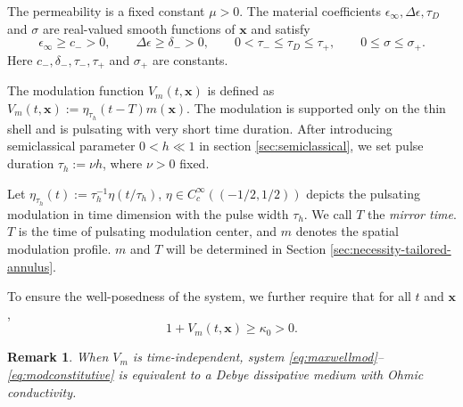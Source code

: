 \documentclass[11pt,reqno]{amsart}
\newtheorem{remark}{Remark}[section]
\numberwithin{equation}{section}
\begin{document}
The permeability is a fixed constant $\mu>0$. The material coefficients $\epsilon_\infty, \Delta\epsilon, \tau_D$ and $\sigma$ are real-valued smooth functions of $\bm{x}$ and satisfy
\begin{equation}\label{eq:modH}
\epsilon_\infty\geq c_->0,
\qquad
\Delta\epsilon\geq\delta_->0,
\qquad
0<\tau_-\le\tau_D\le\tau_+,
\qquad
0\le\sigma\le\sigma_+.
\end{equation}
Here $c_-, \delta_-, \tau_-, \tau_+$ and $\sigma_+$ are constants. 

The modulation function $V_m(t,\bm{x})$ is defined as $V_m(t,\bm{x}):=\eta_{\tau_h}(t-T)m(\bm{x})$. The modulation is supported only on the thin shell and is pulsating with very short time duration. After introducing semiclassical parameter $0<h\ll 1$ in section \ref{sec:semiclassical}, we set pulse duration $\tau_h:=\nu h$, where $\nu>0$ fixed. 

Let $\eta_{\tau_h}(t):=\tau_h^{-1}\eta(t/\tau_h)$, $\eta\in C_c^\infty((-1/2,1/2))$ depicts the pulsating modulation in time dimension with the pulse width $\tau_h$. We call $T$ the \emph{mirror time}. $T$ is the time of pulsating modulation center, and $m$ denotes the spatial modulation profile. $m$ and $T$ will be determined in Section \ref{sec:necessity-tailored-annulus}. 

To ensure the well-posedness of the system, we further require that for all $t$ and $\bm{x}$, 
\begin{equation}\label{eq:material-positivity}
1+V_m(t,\bm{x})\geq\kappa_0>0.
\end{equation}  

\begin{remark}
When $V_m$ is time-independent, system \eqref{eq:maxwellmod}--\eqref{eq:modconstitutive} is equivalent to a Debye dissipative medium with Ohmic conductivity. 
\end{remark}
\end{document}
